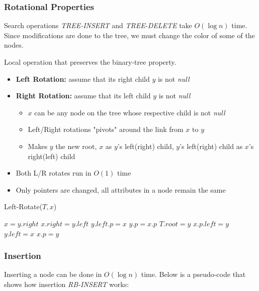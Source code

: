 \documentclass[10pt, 
a4paper, 
oneside, 
headinclude, footinclude, 
BCOR5mm]
{scrartcl}
\begin{document}
\newpage

\subsubsection{Rotational Properties}
Search operations \textit{TREE-INSERT} and \textit{TREE-DELETE} take $O(\log n)$ time. Since modifications are done to the tree, we must change the color of some of the nodes.
\begin{definition}
    Local operation that preserves the binary-tree property. 
    \begin{itemize}
        \item \textbf{Left Rotation:} assume that its right child $y$ is not \textit{null} 
        \item \textbf{Right Rotation:} assume that its left child $y$ is not \textit{null}
        \begin{itemize}
            \item $x$ can be any node on the tree whose respective child is not \textit{null}
            \item Left/Right rotations "pivots" around the link from $x$ to $y$
            \item Makes $y$ the new root, $x$ as $y$'s left(right) child, $y$'s left(right) child as $x$'s right(left) child
        \end{itemize}
        \item Both L/R rotates run in $O(1)$ time
        \item Only pointers are changed, all attributes in a node remain the same
    \end{itemize}
\end{definition}

\begin{algorithm}
    \caption{Left-Rotate($T,x$)}

    $x = y.right$ 
    $x.right = y.left$ 
        {$y.left.p = x$\;}
    $y.p = x.p$\;
        {$T.root = y$\;}
        {$x.p.left = y$\;}
    $y.left = x$\;
    $x.p = y$\;
\end{algorithm}

\newpage 

\subsubsection{Insertion}
Inserting a node can be done in $O(\log n)$ time. Below is a pseudo-code that shows how insertion \textit{RB-INSERT} works:
\end{document}
